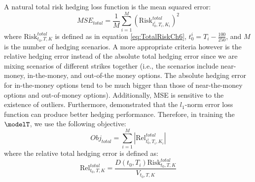 A natural total risk hedging loss function is the mean squared error:
\[
MSE_{total}=\frac{1}{M} \sum_{i=1}^M  (\text{Risk}^{total}_{t_0^i,T_i,K_i})^2
\]
where $\text{Risk}^{total}_{t_0,T,K}$ is defined as in equation \eqref{eq:TotalRiskCh6},  $t_0^i=T_i-\frac{100}{250}$, and $M$ is the number of hedging scenarios.
A more appropriate criteria however is the relative hedging error instead of the absolute total hedging error since we are mixing scenarios of different strikes together (i.e., the scenarios include near-money, in-the-money, and out-of-the money options. The absolute hedging error for in-the-money options tend to be much bigger than those of  near-the-money options and out-of-money options). Additionally, MSE is sensitive to the existence of outliers. Furthermore, \citet{coleman2007total} demonstrated that the  $l_1$-norm error loss function can produce better hedging performance. 
Therefore, in training the $\modelT$, we use the following objective:
\begin{equation}
Obj_{total}=\sum_{i=1}^M \left|\text{Rel}^{total}_{t_0^{i},T_i,K_i}\right|
\label{eq:totalObjLinear}
\end{equation}
where the relative total hedging error is defined as:
\begin{equation}
	\text{Rel}^{total}_{t_0,T,K}
	=\frac{D(t_0,T_i)  \text{Risk}^{total}_{t_0,T,K}}{V_{t_0,T,K}}
	\label{eq:relHError}
\end{equation}


%
%


